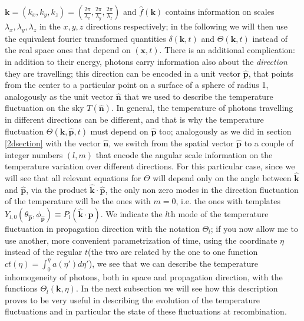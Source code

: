 \documentclass[11pt, a4paper,oneside,openright]{book}
\numberwithin{equation}{section}
\begin{document}
$\mathbf{k}=(k_x,k_y,k_z)=\left(\frac{2\pi}{\lambda_x},\frac{2\pi}{\lambda_y},\frac{2\pi}{\lambda_z}\right)$ and $\hat{f}(\mathbf{k})$ contains information on scales $\lambda_x,\lambda_y,\lambda_z$ in the $x,y,z$ directions respectively; in the following we will then use the equivalent fourier transformed quantities $\delta(\mathbf{k},t)$ and $\Theta(\mathbf{k},t)$ instead of the real space ones that depend on $(\mathbf{x},t)$. There is an additional complication: in addition to their energy, photons carry information also about the \textit{direction} they are travelling; this direction can be encoded in a unit vector $\mathbf{\hat{p}}$, that points from the center to a particular point on a surface of a sphere of radius 1, analogously as the unit vector $\mathbf{\hat{n}}$ that we used to describe the temperature fluctuation on the sky $T(\mathbf{\hat{n}})$. In general, the temperature of photons travelling in different directions can be different, and that is why the temperature fluctuation $\Theta(\mathbf{
k},\mathbf{\hat{p}},t)$ must depend on $\mathbf{\hat{p}}$ too; analogously as we did in section \ref{2dsection} with the vector $\mathbf{\hat{n}}$, we switch from the spatial vector $\mathbf{\hat{p}}$ to a couple of integer numbers $(l,m)$ that encode the angular scale information on the temperature variation over different directions. For this particular case, since we will see that all relevant equations for $\Theta$ will depend only on the angle between $\mathbf{\hat{k}}$ and $\mathbf{\hat{p}}$, via the product $\mathbf{\hat{k}}\cdot\mathbf{\hat{p}}$, the only non zero modes in the direction fluctuation of the temperature will be the ones with $m=0$, i.e. the ones with templates $Y_{l,0}(\theta_{\mathbf{\hat{p}}},\phi_{\mathbf{\hat{p}}})\equiv P_l(\mathbf{\hat{k}}\cdot \mathbf{\hat{p}})$. We indicate the $l$th mode of the temperature fluctuation in propagation direction with the notation $\Theta_l$; if you now allow me to use another, more convenient parametrization of time, using the coordinate $\eta$ 
instead of the regular $t$(the two are related by the one to one function $ct(\eta)=\int_0^\eta a(\eta')d\eta'$), we see that we can describe the temperature inhomogeneity of photons, both in space and propagation direction, with the functions $\Theta_l(\mathbf{k},\eta)$. In the next subsection we will see how this description proves to be very useful in describing the evolution of the temperature fluctuations and in particular the state of these fluctuations at recombination. 
\end{document}
